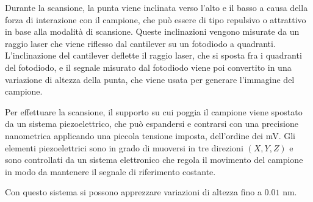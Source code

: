 \documentclass[../main.tex]{subfiles}
\begin{document}
Durante la scansione, la punta viene inclinata verso l'alto e il basso a causa della forza di interazione con il campione, che può essere di tipo repulsivo o attrattivo in base alla modalità di scansione. Queste inclinazioni vengono misurate da un raggio laser che viene riflesso dal cantilever su un fotodiodo a quadranti. L'inclinazione del cantilever deflette il raggio laser, che si sposta fra i quadranti del fotodiodo, e il segnale misurato dal fotodiodo viene poi convertito in una variazione di altezza della punta, che viene usata per generare l'immagine del campione.

Per effettuare la scansione, il supporto su cui poggia il campione viene spostato da un sistema piezoelettrico, che può espandersi e contrarsi con una precisione nanometrica applicando una piccola tensione imposta, dell'ordine dei mV. Gli elementi piezoelettrici sono in grado di muoversi in tre direzioni $(X, Y, Z)$ e sono controllati da un sistema elettronico che regola il movimento del campione in modo da mantenere il segnale di riferimento costante.

Con questo sistema si possono apprezzare variazioni di altezza fino a $0.01$ nm.\cite{sun_2018}
\end{document}
